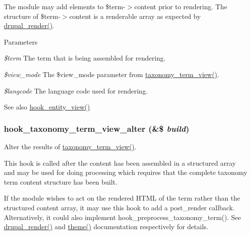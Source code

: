 The module may add elements to \$term-\/$>$content prior to rendering. The structure of \$term-\/$>$content is a renderable array as expected by \hyperlink{common_8inc_a05798b44e8d6c496d4bee5cc32fa7851}{drupal\_\-render()}.


\begin{DoxyParams}{Parameters}
\item[{\em \$term}]The term that is being assembled for rendering. \item[{\em \$view\_\-mode}]The \$view\_\-mode parameter from \hyperlink{taxonomy_8module_a852150709c30aa1f36a2f50ffc26cf7a}{taxonomy\_\-term\_\-view()}. \item[{\em \$langcode}]The language code used for rendering.\end{DoxyParams}
\begin{DoxySeeAlso}{See also}
\hyperlink{group__hooks_gae273ba271c2ef1192fe135afa9da5d49}{hook\_\-entity\_\-view()} 
\end{DoxySeeAlso}
\hypertarget{group__hooks_gad02862e477fbc925f70a7f91d2916820}{
\subsubsection[{hook\_\-taxonomy\_\-term\_\-view\_\-alter}]{\setlength{\rightskip}{0pt plus 5cm}hook\_\-taxonomy\_\-term\_\-view\_\-alter (\&\$ {\em build})}}
\label{group__hooks_gad02862e477fbc925f70a7f91d2916820}
Alter the results of \hyperlink{taxonomy_8module_a852150709c30aa1f36a2f50ffc26cf7a}{taxonomy\_\-term\_\-view()}.

This hook is called after the content has been assembled in a structured array and may be used for doing processing which requires that the complete taxonomy term content structure has been built.

If the module wishes to act on the rendered HTML of the term rather than the structured content array, it may use this hook to add a post\_\-render callback. Alternatively, it could also implement hook\_\-preprocess\_\-taxonomy\_\-term(). See \hyperlink{common_8inc_a05798b44e8d6c496d4bee5cc32fa7851}{drupal\_\-render()} and \hyperlink{includes_2theme_8inc_a7c25609a935874541a19657affd30fff}{theme()} documentation respectively for details.



